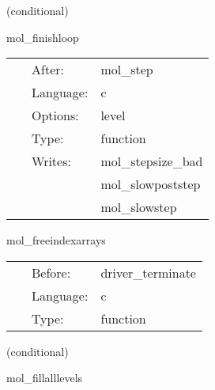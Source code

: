 \vspace{5mm}

   (conditional) 

\hspace{5mm} mol\_finishloop 

\hspace{5mm}{\it control the step size } 


\hspace{5mm}

 \begin{tabular*}{160mm}{cll} 
~ & After:  & mol\_step \\ 
~ & Language:  & c \\ 
~ & Options:  & level \\ 
~ & Type:  & function \\ 
~ & Writes:  & mol\_stepsize\_bad \\ 
~& ~ &mol\_slowpoststep\\ 
~& ~ &mol\_slowstep\\ 
\end{tabular*} 


\vspace{5mm}


\hspace{5mm} mol\_freeindexarrays 

\hspace{5mm}{\it free the mol bookkeeping index arrays } 


\hspace{5mm}

 \begin{tabular*}{160mm}{cll} 
~ & Before:  & driver\_terminate \\ 
~ & Language:  & c \\ 
~ & Type:  & function \\ 
\end{tabular*} 


\vspace{5mm}

   (conditional) 

\hspace{5mm} mol\_fillalllevels 

\hspace{5mm}{\it a bad routine. fills all previous timelevels with data copied from the current. } 


\hspace{5mm}

